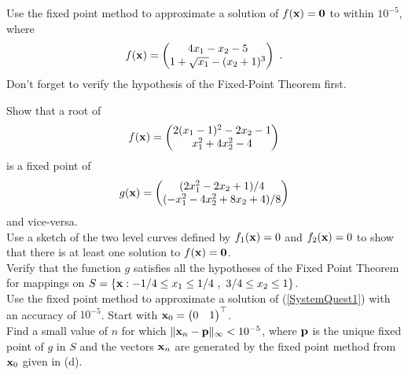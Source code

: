 \begin{question}
Use the fixed point method to approximate a solution of
$f(\mathbf{x})=\mathbf{0}$ to within $10^{-5}$, where
\[
f(\mathbf{x}) =
\begin{pmatrix}
4 x_1 - x_2 - 5 \\
1 + \sqrt{x_1} - (x_2 + 1)^3
\end{pmatrix} \ .
\]
Don't forget to verify the hypothesis of the Fixed-Point Theorem
first.
\label{solvDQ3}
\end{question}

\begin{question}
 Show that a root of
\begin{equation} \label{SystemQuest1}
f(\mathbf{x}) = \begin{pmatrix}
2(x_1-1)^2 - 2x_2 - 1 \\
x_1^2 + 4x_2^2 - 4
\end{pmatrix}
\end{equation}
is a fixed point of
\[
g(\mathbf{x}) =
\begin{pmatrix}
(2x_1^2 - 2x_2 +1)/4 \\
(-x_1^2 - 4x_2^2 + 8x_2 + 4)/8
\end{pmatrix}
\]
and vice-versa.\\
 Use a sketch of the two level curves defined by $f_1(\mathbf{x})=0$
and $f_2(\mathbf{x}) =0$ to show that there is at least one solution to
$f(\mathbf{x}) = \mathbf{0}$.\\
 Verify that the function $g$ satisfies all the hypotheses
of the Fixed Point Theorem for mappings on
$S =\left\{ \VEC{x} : -1/4 \leq x_1 \leq 1/4 \ ,
\ 3/4 \leq x_2 \leq 1 \right\}$.\\
 Use the fixed point method to approximate a
solution of (\ref{SystemQuest1}) with an accuracy of $10^{-5}$.  Start with
$\displaystyle \mathbf{x}_0 = \begin{pmatrix} 0 & 1 \end{pmatrix}^\top$.\\
 Find a small value of $n$ for which 
$\| \mathbf{x}_n - \mathbf{p}\|_\infty < 10^{-5}$, where $\mathbf{p}$ is the
unique fixed point of $g$ in $S$ and the vectors $\mathbf{x}_n$
are generated by the fixed point method from $\mathbf{x}_0$ given in (d).
\label{solvDQ4}
\end{question}

% 
% 
%
%
%

